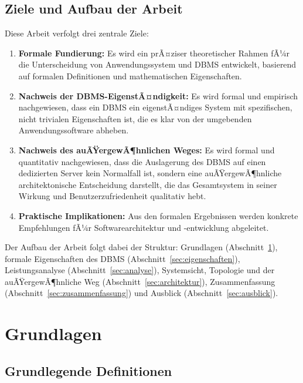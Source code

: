 ﻿\documentclass[a4paper,12pt]{article}
\theoremstyle{definition}
\begin{document}
\subsection{Ziele und Aufbau der Arbeit}

Diese Arbeit verfolgt drei zentrale Ziele:

\begin{enumerate}
	\item \textbf{Formale Fundierung:} Es wird ein prÃ¤ziser theoretischer Rahmen fÃ¼r die Unterscheidung von Anwendungssystem und DBMS entwickelt, basierend auf formalen Definitionen und mathematischen Eigenschaften.
	\item \textbf{Nachweis der DBMS-EigenstÃ¤ndigkeit:} Es wird formal und empirisch nachgewiesen, dass ein DBMS ein eigenstÃ¤ndiges System mit spezifischen, nicht trivialen Eigenschaften ist, die es klar von der umgebenden Anwendungssoftware abheben.
	\item \textbf{Nachweis des auÃŸergewÃ¶hnlichen Weges:} Es wird formal und quantitativ nachgewiesen, dass die Auslagerung des DBMS auf einen dedizierten Server kein Normalfall ist, sondern eine auÃŸergewÃ¶hnliche architektonische Entscheidung darstellt, die das Gesamtsystem in seiner Wirkung und Benutzerzufriedenheit qualitativ hebt.
\item \textbf{Praktische Implikationen:} Aus den formalen Ergebnissen werden konkrete Empfehlungen fÃ¼r Softwarearchitektur und -entwicklung abgeleitet.
\end{enumerate}

Der Aufbau der Arbeit folgt dabei der Struktur: Grundlagen (Abschnitt~\ref{sec:grundlagen}), formale Eigenschaften des DBMS (Abschnitt~\ref{sec:eigenschaften}), Leistungsanalyse (Abschnitt~\ref{sec:analyse}), Systemsicht, Topologie und der auÃŸergewÃ¶hnliche Weg (Abschnitt~\ref{sec:architektur}), Zusammenfassung (Abschnitt~\ref{sec:zusammenfassung}) und Ausblick (Abschnitt~\ref{sec:ausblick}).

\section{Grundlagen}
\label{sec:grundlagen}

\subsection{Grundlegende Definitionen}
\end{document}
